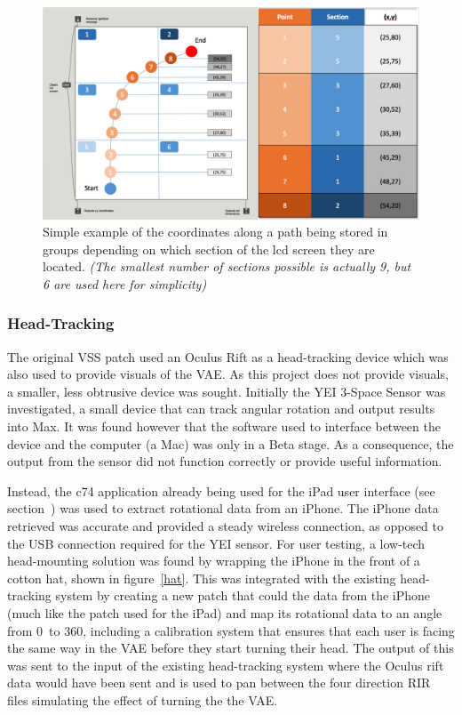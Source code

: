 \documentclass[../../main.tex]{subfiles}
\begin{document}
			\begin{figure}
				\centerline{\includegraphics[width=\textwidth]{Sections/Implementation/Max/images/Max/UserInterface/locationsExample2.png}}
				\caption{Simple example of the coordinates along a path being stored in groups depending on which section of the lcd screen they are located. \textit{(The smallest number of sections possible is actually 9, but 6 are used here for simplicity)}}
				\label{locationsExample}
			\end{figure}

	\subsubsection{Head-Tracking}

		The original \ac{VSS} patch used an Oculus Rift as a head-tracking device which was also used to provide visuals of the \ac{VAE}. As this project does not provide visuals, a smaller, less obtrusive device was sought. Initially the YEI 3-Space Sensor \cite{YEI} was investigated, a small device that can track angular rotation and output results into Max. It was found however that the software used to interface between the device and the computer (a Mac) was only in a Beta stage. As a consequence, the output from the sensor did not function correctly or provide useful information.

		Instead, the c74 application already being used for the iPad user interface (see section~) was used to extract rotational data from an iPhone. The iPhone data retrieved was accurate and provided a steady wireless connection, as opposed to the USB connection required for the YEI sensor. For user testing, a low-tech head-mounting solution was found by wrapping the iPhone in the front of a cotton hat, shown in figure~\ref{hat}. This was integrated with the existing head-tracking system by creating a new patch that could the data from the iPhone (much like the patch used for the iPad) and map its rotational data to an angle from 0\textdegree~to 360\textdegree, including a calibration system that ensures that each user is facing the same way in the \ac{VAE} before they start turning their head. The output of this was sent to the input of the existing head-tracking system where the Oculus rift data would have been sent and is used to pan between the four direction \ac{RIR} files simulating the effect of turning the the \ac{VAE}.
\end{document}
